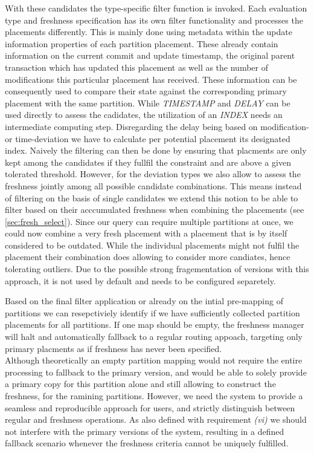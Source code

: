 With these candidates the type-specific filter function is invoked. Each evaluation type and freshness specification has its own filter functionality and
processes the placements differently. This is mainly done using metadata within the update information properties of each partition placement. 
These already contain information on the current commit and update timestamp,
the original parent transaction which has updated this placement as well as the number of modifications this particular placement has received.
These information can be consequently used to compare their state against the corresponding primary placement with the same partition. 
While \emph{TIMESTAMP} and \emph{DELAY} can be used directly to assess the cadidates, the utilization of an \emph{INDEX} needs an intermediate computing step.
Disregarding the delay being based on modification- or time-deviation we have to calculate per potential placement its designated index.
Naively the filtering can then be done by ensuring that placments are only kept among the candidates if they fullfil the constraint and are above 
a given tolerated threshold. However, for the deviation types we also allow to assess the freshness jointly among all possible candidate combinations.
This means instead of filtering on the basis of single candidates we extend this notion to be able to filter based on their acccumulated freshness when combining the placements
(see \ref{sec:fresh_select}).
Since our query can require multiple partitions at once, we could now combine a very fresh placement with a placement that is by itself considered to be outdated.
While the individual placements might not fulfil the placement their combination does allowing to consider more candiates, hence tolerating outliers.
Due to the possible strong fragementation of versions with this approach, it is not used by default and needs to be configured separetely.

Based on the final filter application or already on the intial pre-mapping of partitions we can resepctiviely identify if we have sufficiently collected partition placements 
for all partitions. If one map should be empty, the freshness manager will halt and automatically fallback to a regular routing appoach, targeting only primary placments 
as if freshness has never been specified. \\

Although theoretically an empty partition mapping would not require the entire processing to fallback to the primary version, and 
would be able to solely provide a primary copy for this partition alone and still allowing to construct the freshness, 
for the ramining partitions. 
However, we need the system to provide a seamless and reproducible approach for users, and strictly distinguish between regular and freshness operations. 
As also defined with requirement \textit{(vi)} we should not interfere with the primary versions of the system, resulting in a defined fallback scenario whenever the freshness
criteria cannot be uniquely fulfilled.



